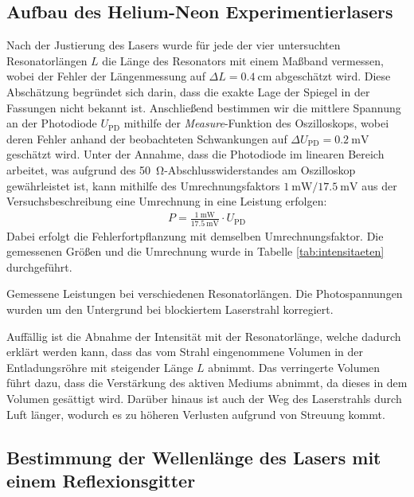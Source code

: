 \documentclass[11pt, a4paper]{article}
\numberwithin{equation}{section}
\begin{document}
\subsection{Aufbau des Helium-Neon Experimentierlasers}
Nach der Justierung des Lasers wurde für jede der vier untersuchten Resonatorlängen $L$ die Länge des Resonators mit einem Maßband vermessen, wobei der Fehler der Längenmessung auf $\Delta L = \SI{0.4}{\centi\metre}$ abgeschätzt wird.
Diese Abschätzung begründet sich darin, dass die exakte Lage der Spiegel in der Fassungen nicht bekannt ist.
Anschließend bestimmen wir die mittlere Spannung an der Photodiode $U_\mathrm{PD}$ mithilfe der \textit{Measure}-Funktion des Oszilloskops, wobei deren Fehler anhand der beobachteten Schwankungen auf $\Delta U_\mathrm{PD} = \SI{0.2}{\milli\volt}$ geschätzt wird.
Unter der Annahme, dass die Photodiode im linearen Bereich arbeitet, was aufgrund des \SI{50}{\ohm}-Abschlusswiderstandes am Oszilloskop gewährleistet ist, kann mithilfe des Umrechnungsfaktors $\SI{1}{\milli\watt} / \SI{17.5}{\milli\volt}$ aus der Versuchsbeschreibung \cite{anleitung} eine Umrechnung in eine Leistung erfolgen:
\begin{align}
	P = \frac{\SI{1}{\milli\watt}}{\SI{17.5}{\milli\volt}} \cdot U_\mathrm{PD}
	\label{eq:umrechnung_watt}
\end{align}
Dabei erfolgt die Fehlerfortpflanzung mit demselben Umrechnungsfaktor.
Die gemessenen Größen und die Umrechnung wurde in Tabelle \ref{tab:intensitaeten} durchgeführt.
\begin{table}[h]
	\centering
	
	\caption{Gemessene Leistungen bei verschiedenen Resonatorlängen. Die Photospannungen wurden um den Untergrund bei blockiertem Laserstrahl korregiert.}
	\label{tab:intensitaeten}
\end{table}
Auffällig ist die Abnahme der Intensität mit der Resonatorlänge, welche dadurch erklärt werden kann, dass das vom Strahl eingenommene Volumen in der Entladungsröhre mit steigender Länge $L$ abnimmt.
Das verringerte Volumen führt dazu, dass die Verstärkung des aktiven Mediums abnimmt, da dieses in dem Volumen gesättigt wird.
Darüber hinaus ist auch der Weg des Laserstrahls durch Luft länger, wodurch es zu höheren Verlusten aufgrund von Streuung kommt.

\subsection{Bestimmung der Wellenlänge des Lasers mit einem Reflexionsgitter}
\end{document}
